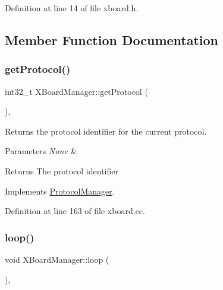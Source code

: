 Definition at line 14 of file xboard.\+h.



\subsection{Member Function Documentation}
\mbox{\label{classXBoardManager_a388ebffa15fa11ee763f4144f01fbcaf}} 
\subsubsection{\texorpdfstring{get\+Protocol()}{getProtocol()}}
{\footnotesize\ttfamily int32\+\_\+t X\+Board\+Manager\+::get\+Protocol (\begin{DoxyParamCaption}{ }\end{DoxyParamCaption})\hspace{0.3cm}{\ttfamily [override]}, {\ttfamily [virtual]}}



Returns the protocol identifier for the current protocol. 


\begin{DoxyParams}{Parameters}
{\em None} & \\
\hline
\end{DoxyParams}
\begin{DoxyReturn}{Returns}
The protocol identifier 
\end{DoxyReturn}


Implements \mbox{\hyperlink{classProtocolManager_a2ab274fd7510b28e7ac36405aebdbe82}{Protocol\+Manager}}.



Definition at line 163 of file xboard.\+cc.

\mbox{\label{classXBoardManager_a7d59ec1b3eaf1d140ad8f7cacd2ae956}} 
\subsubsection{\texorpdfstring{loop()}{loop()}}
{\footnotesize\ttfamily void X\+Board\+Manager\+::loop (\begin{DoxyParamCaption}{ }\end{DoxyParamCaption})\hspace{0.3cm}{\ttfamily [override]}, {\ttfamily [virtual]}}



